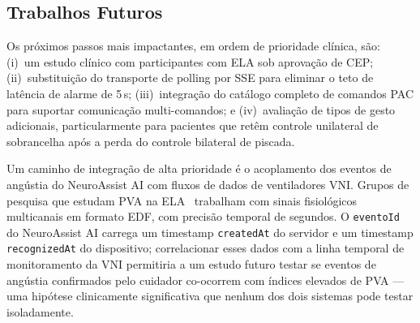 \subsection{Trabalhos Futuros}

Os próximos passos mais impactantes, em ordem de prioridade clínica, são: (i)~um
estudo clínico com participantes com ELA sob aprovação de CEP; (ii)~substituição do
transporte de polling por SSE para eliminar o teto de latência de alarme de 5\,s;
(iii)~integração do catálogo completo de comandos PAC para suportar comunicação
multi-comandos; e (iv)~avaliação de tipos de gesto adicionais, particularmente para
pacientes que retêm controle unilateral de sobrancelha após a perda do controle
bilateral de piscada.

Um caminho de integração de alta prioridade é o acoplamento dos eventos de angústia
do NeuroAssist AI com fluxos de dados de ventiladores VNI. Grupos de pesquisa que
estudam PVA na ELA~\cite{stell2024pva, yang2026pva} trabalham com sinais fisiológicos
multicanais em formato EDF, com precisão temporal de segundos. O \texttt{eventoId}
do NeuroAssist AI carrega um timestamp \texttt{createdAt} do servidor e um timestamp
\texttt{recognizedAt} do dispositivo; correlacionar esses dados com a linha temporal
de monitoramento da VNI permitiria a um estudo futuro testar se eventos de angústia
confirmados pelo cuidador co-ocorrem com índices elevados de PVA — uma hipótese
clinicamente significativa que nenhum dos dois sistemas pode testar isoladamente.

